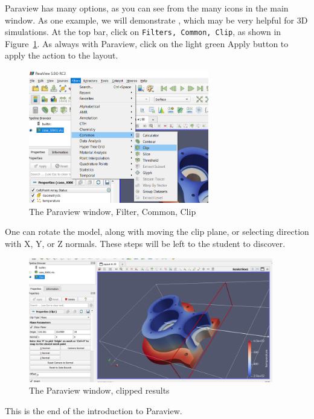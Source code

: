 Paraview has many options, as you can see from the many icons in the main window.  As one example, we will demonstrate , which may be very helpful for 3D simulations.  At the top bar, click on \texttt{Filters, Common, Clip}, as shown in Figure~\ref{fg:paraview-6}.  As always with Paraview, click on the light green Apply button to apply the action to the layout.

\begin{figure}[H]
\begin{center}
\includegraphics[width=0.7\textwidth]{paraview-6}
\caption{The Paraview window, Filter, Common, Clip}\label{fg:paraview-6}
\end{center}
\end{figure}

\newpage

One can rotate the model, along with moving the clip plane, or selecting direction with X, Y, or Z normals.  These steps will be left to the student to discover.

\begin{figure}[H]
\begin{center}
\includegraphics[width=0.95\textwidth]{paraview-7}
\caption{The Paraview window, clipped results}\label{fg:paraview-7}
\end{center}
\end{figure}

This is the end of the introduction to Paraview.
